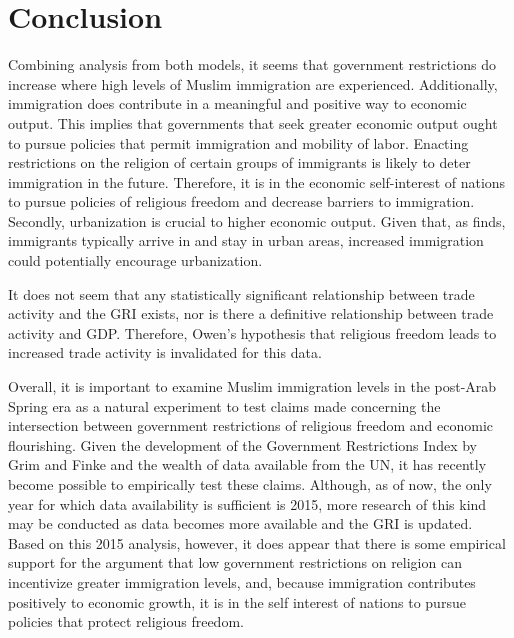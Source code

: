 \documentclass[12pt,english]{article}
\begin{document}
\section{Conclusion}
Combining analysis from both models, it seems that government restrictions do increase where high levels of Muslim immigration are experienced. Additionally, immigration does contribute in a meaningful and positive way to economic output. This implies that governments that seek greater economic output ought to pursue policies that permit immigration and mobility of labor. Enacting restrictions on the religion of certain groups of immigrants is likely to deter immigration in the future. Therefore, it is in the economic self-interest of nations to pursue policies of religious freedom and decrease barriers to immigration.
Secondly, urbanization is crucial to higher economic output. Given that, as \citet{James} finds, immigrants typically arrive in and stay in urban areas, increased immigration could potentially encourage urbanization.

It does not seem that any statistically significant relationship between trade activity and the GRI exists, nor is there a definitive relationship between trade activity and GDP. Therefore, Owen's hypothesis that religious freedom leads to increased trade activity is invalidated for this data.

Overall, it is important to examine Muslim immigration levels in the post-Arab Spring era as a natural experiment to test claims made concerning the intersection between government restrictions of religious freedom and economic flourishing. Given the development of the Government Restrictions Index by Grim and Finke and the wealth of data available from the UN, it has recently become possible to empirically test these claims. Although, as of now, the only year for which data availability is sufficient is 2015, more research of this kind may be conducted as data becomes more available and the GRI is updated. Based on this 2015 analysis, however, it does appear that there is some empirical support for the argument that low government restrictions on religion can incentivize greater immigration levels, and, because immigration contributes positively to economic growth, it is in the self interest of nations to pursue policies that protect religious freedom.



\vfill
\pagebreak{}
\begin{spacing}{1.0}


\end{spacing}
\end{document}
